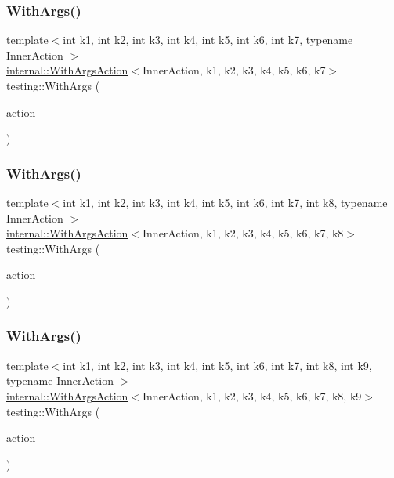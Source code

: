 \subsubsection{\texorpdfstring{WithArgs()}{WithArgs()}\hspace{0.1cm}{\footnotesize\ttfamily [7/10]}}
{\footnotesize\ttfamily template$<$int k1, int k2, int k3, int k4, int k5, int k6, int k7, typename Inner\+Action $>$ \\
\mbox{\hyperlink{classtesting_1_1internal_1_1WithArgsAction}{internal\+::\+With\+Args\+Action}}$<$Inner\+Action, k1, k2, k3, k4, k5, k6, k7$>$ testing\+::\+With\+Args (\begin{DoxyParamCaption}\item[{const Inner\+Action \&}]{action }\end{DoxyParamCaption})\hspace{0.3cm}{\ttfamily [inline]}}

\mbox{\label{namespacetesting_a16c131c0d58ae07d2e1ee6c7a44aaad1}} 
\subsubsection{\texorpdfstring{WithArgs()}{WithArgs()}\hspace{0.1cm}{\footnotesize\ttfamily [8/10]}}
{\footnotesize\ttfamily template$<$int k1, int k2, int k3, int k4, int k5, int k6, int k7, int k8, typename Inner\+Action $>$ \\
\mbox{\hyperlink{classtesting_1_1internal_1_1WithArgsAction}{internal\+::\+With\+Args\+Action}}$<$Inner\+Action, k1, k2, k3, k4, k5, k6, k7, k8$>$ testing\+::\+With\+Args (\begin{DoxyParamCaption}\item[{const Inner\+Action \&}]{action }\end{DoxyParamCaption})\hspace{0.3cm}{\ttfamily [inline]}}

\mbox{\label{namespacetesting_a6aec78e6c201b150c78271e3f851414e}} 
\subsubsection{\texorpdfstring{WithArgs()}{WithArgs()}\hspace{0.1cm}{\footnotesize\ttfamily [9/10]}}
{\footnotesize\ttfamily template$<$int k1, int k2, int k3, int k4, int k5, int k6, int k7, int k8, int k9, typename Inner\+Action $>$ \\
\mbox{\hyperlink{classtesting_1_1internal_1_1WithArgsAction}{internal\+::\+With\+Args\+Action}}$<$Inner\+Action, k1, k2, k3, k4, k5, k6, k7, k8, k9$>$ testing\+::\+With\+Args (\begin{DoxyParamCaption}\item[{const Inner\+Action \&}]{action }\end{DoxyParamCaption})\hspace{0.3cm}{\ttfamily [inline]}}


